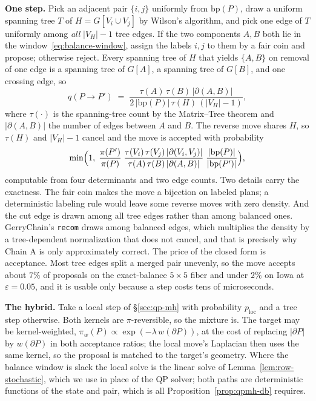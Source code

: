 \documentclass[11pt]{article}
\begin{document}
\textbf{One step.} Pick an adjacent pair $\{i,j\}$ uniformly from
$\mathrm{bp}(P)$, draw a uniform spanning tree $T$ of
$H = G[V_i \cup V_j]$ by Wilson's algorithm, and pick one edge of $T$
uniformly among \emph{all} $|V_H| - 1$ tree edges. If the two
components $A, B$ both lie in the window~\eqref{eq:balance-window},
assign the labels $i, j$ to them by a fair coin and propose; otherwise
reject. Every spanning tree of $H$ that yields $\{A, B\}$ on removal
of one edge is a spanning tree of $G[A]$, a spanning tree of $G[B]$,
and one crossing edge, so
\[
  q(P \to P') \;=\;
  \frac{\tau(A)\,\tau(B)\,|\partial(A,B)|}
       {2\,|\mathrm{bp}(P)|\,\tau(H)\,(|V_H| - 1)},
\]
where $\tau(\cdot)$ is the spanning-tree count by the Matrix--Tree
theorem and $|\partial(A,B)|$ the number of edges between $A$ and $B$.
The reverse move shares $H$, so $\tau(H)$ and $|V_H| - 1$ cancel and
the move is accepted with probability
\[
  \min\Bigl(1,\;
  \frac{\pi(P')}{\pi(P)}\;
  \frac{\tau(V_i)\,\tau(V_j)\,|\partial(V_i,V_j)|}
       {\tau(A)\,\tau(B)\,|\partial(A,B)|}\;
  \frac{|\mathrm{bp}(P)|}{|\mathrm{bp}(P')|}\Bigr),
\]
computable from four determinants and two edge counts. Two details
carry the exactness. The fair coin makes the move a bijection on
labeled plans; a deterministic labeling rule would leave some reverse
moves with zero density. And the cut edge is drawn among all tree
edges rather than among balanced ones. GerryChain's \texttt{recom}
draws among balanced edges, which multiplies the density by a
tree-dependent normalization that does not cancel, and that is
precisely why Chain A is only approximately correct. The price of the
closed form is acceptance. Most tree edges split a merged pair
unevenly, so the move accepts about $7\%$ of proposals on the
exact-balance $5 \times 5$ fiber and under $2\%$ on Iowa at
$\varepsilon = 0.05$, and it is usable only because a step costs tens
of microseconds.

\textbf{The hybrid.} Take a local step of \S\ref{sec:qp-mh} with
probability $p_{\mathrm{loc}}$ and a tree step otherwise. Both kernels
are $\pi$-reversible, so the mixture is. The target may be
kernel-weighted, $\pi_w(P) \propto \exp(-\lambda\, w(\partial P))$,
at the cost of replacing $|\partial P|$ by $w(\partial P)$ in both
acceptance ratios; the local move's Laplacian then uses the same
kernel, so the proposal is matched to the target's geometry. Where the
balance window is slack the local solve is the linear solve of
Lemma~\ref{lem:row-stochastic}, which we use in place of the QP
solver; both paths are deterministic functions of the state and pair,
which is all Proposition~\ref{prop:qpmh-db} requires.
\end{document}
